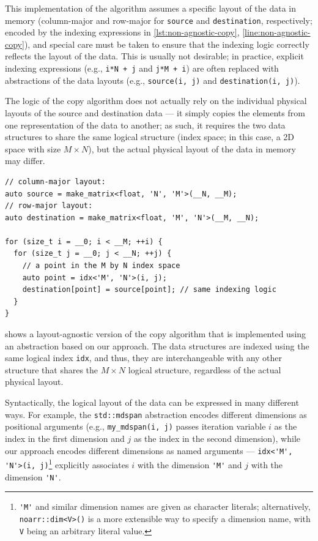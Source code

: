 This implementation of the algorithm assumes a specific layout of the data in memory (column-major and row-major for \lstinline{source} and \lstinline{destination}, respectively; encoded by the indexing expressions in \cref{lst:non-agnostic-copy}, \cref{line:non-agnostic-copy}), and special care must be taken to ensure that the indexing logic correctly reflects the layout of the data. This is usually not desirable; in practice, explicit indexing expressions (e.g., \texttt{i*N + j} and \texttt{j*M + i}) are often replaced with abstractions of the data layouts (e.g., \lstinline{source(i, j)} and \lstinline{destination(i, j)}).

The logic of the copy algorithm does not actually rely on the individual physical layouts of the source and destination data --- it simply copies the elements from one representation of the data to another; as such, it requires the two data structures to share the same logical structure (index space; in this case, a 2D space with size $M \times N$), but the actual physical layout of the data in memory may differ.

\begin{lstlisting}[style=C++, caption={A layout-agnostic copy algorithm}, label={lst:layout-agnostic-copy}]
// column-major layout:
auto source = make_matrix<float, 'N', 'M'>(__N, __M);
// row-major layout:
auto destination = make_matrix<float, 'M', 'N'>(__M, __N);

for (size_t i = __0; i < __M; ++i) {
  for (size_t j = __0; j < __N; ++j) {
    // a point in the M by N index space
    auto point = idx<'M', 'N'>(i, j);
    destination[point] = source[point]; // same indexing logic
  }
}
\end{lstlisting}

 shows a layout-agnostic version of the copy algorithm that is implemented using an abstraction based on our approach. The data structures are indexed using the same logical index \lstinline{idx}, and thus, they are interchangeable with any other structure that shares the $M \times N$ logical structure, regardless of the actual physical layout.

Syntactically, the logical layout of the data can be expressed in many different ways. For example, the \lstinline{std::mdspan} abstraction encodes different dimensions as positional arguments (e.g., \lstinline{my_mdspan(i, j)} passes iteration variable $i$ as the index in the first dimension and $j$ as the index in the second dimension), while our approach encodes different dimensions as named arguments --- \lstinline{idx<'M', 'N'>(i, j)}\footnote{\lstinline{'M'} and similar dimension names are given as \cpp character literals; alternatively, \lstinline{noarr::dim<V>()} is a more extensible way to specify a dimension name, with \lstinline{V} being an arbitrary literal value.} explicitly associates $i$ with the dimension \lstinline{'M'} and $j$ with the dimension \lstinline{'N'}.


